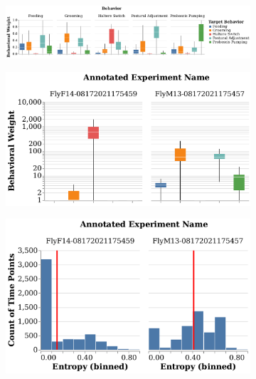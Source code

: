 \begin{figure}[ht!]
	\centering
	\begin{subfigure}[ht!]{0.9\linewidth}
		\centering\includegraphics[width=\linewidth]{figures/BehavioralWeightDistributions_perBehavior.pdf}
		\caption{}
	\end{subfigure}%

	\centering
	\begin{subfigure}[ht!]{0.55\linewidth}
		\centering\includegraphics[width=\linewidth]{figures/BehavioralWeight-RepertoireDifference.pdf}
		\caption{}
	\end{subfigure}%
	\centering
	\begin{subfigure}[ht!]{0.45\linewidth}
		\centering\includegraphics[width=\linewidth]{figures/Entropy-RepertoireDifference.pdf}
		\caption{}
	\end{subfigure}%
\end{figure}
